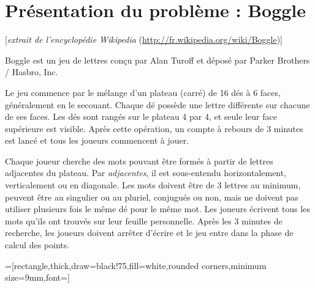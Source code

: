 \documentclass[10pt]{article}
\begin{document}
\clearpage
\section*{Présentation du problème : Boggle}

[{\it extrait de l'encyclopédie Wikipedia} (\url{http://fr.wikipedia.org/wiki/Boggle})]

Boggle est un jeu de lettres conçu par Alan Turoff et déposé par Parker Brothers / Hasbro, Inc.

Le jeu commence par le mélange d'un plateau (carré) de 16 dés à 6 faces, généralement en le secouant. 
Chaque dé possède une lettre différente sur chacune de ses faces. Les dés sont rangés sur le plateau
4 par 4, et seule leur face supérieure est visible. Après cette opération, un compte à rebours de
3 minutes est lancé et tous les joueurs commencent à jouer.

Chaque joueur cherche des mots pouvant être formés à partir de lettres adjacentes du plateau. 
Par \emph{adjacentes}, il est sous-entendu horizontalement, verticalement ou en diagonale. Les mots
doivent être de 3 lettres au minimum, peuvent être au singulier ou au pluriel, conjugués ou non,
mais ne doivent pas utiliser plusieurs fois le même dé pour le même mot. Les joueurs écrivent
tous les mots qu'ils ont trouvés sur leur feuille personnelle. Après les 3 minutes de recherche,
les joueurs doivent arrêter d'écrire et le jeu entre dans la phase de calcul des points.


=[rectangle,thick,draw=black!75,fill=white,rounded corners,minimum size=9mm,font=\sf\Large]

\begin{center}
\end{center}
\end{document}
